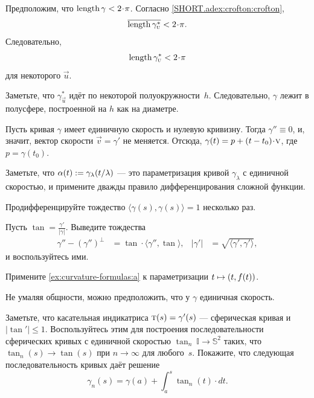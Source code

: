 \begin{multicols}{2}
Предположим, что $\length \gamma<2\cdot\pi$.
Согласно \ref{SHORT.adex:crofton:crofton},
\[\overline{\length \gamma^*_{\vec u}}<2\cdot\pi.\]
Следовательно, 
\[\length \gamma^*_{\vec u}<2\cdot\pi\]
для некоторого ${\vec u}$. 

Заметьте, что $\gamma^*_{\vec u}$ идёт по некоторой полуокружности~$h$.
Следовательно, $\gamma$ лежит в полусфере, построенной на $h$ как на диаметре.


\setcounter{eqtn}{0}

Пусть кривая $\gamma$ имеет единичную скорость и нулевую кривизну. 
Тогда $\gamma''\equiv 0$, и, значит, вектор скорости $\vec v=\gamma'$ не меняется.
Отсюда, $\gamma(t)\z=p+(t-t_0)\cdot \vec v$, где $p=\gamma(t_0)$.

Заметьте, что $\alpha(t)\mathrel{:=}\gamma_{\lambda}(t/\lambda)$ --- это параметризация кривой $ \gamma_{\lambda}$ с единичной скоростью,
и примените дважды правило дифференцирования сложной функции.

Продифференцируйте тождество $\langle\gamma(s),\gamma(s)\rangle=1$ несколько раз.

Пусть $\tan=\tfrac{\gamma'}{|\gamma|}$.
Выведите  тождества
\begin{align*}
\gamma''-(\gamma'')^\perp&=\tan\cdot\langle\gamma'',\tan\rangle,
&
|\gamma'|&=\sqrt{\langle \gamma',\gamma'\rangle},
\end{align*}
и воспользуйтесь ими.

Примените \ref{ex:curvature-formulas:a} к параметризации $t\z\mapsto (t,f(t))$.

Не умаляя общности, можно предположить, что у $\gamma$ единичная скорость.

Заметьте, что касательная индикатриса $\tan(s)\z=\gamma'(s)$ --- сферическая кривая и $|\tan'|\le 1$.
Воспользуйтесь этим для построения последовательности сферических кривых с единичной скоростью $\tan_n\:\mathbb{I}\to\mathbb{S}^2$ таких, что $\tan_n(s)\to \tan(s)$ при $n\to\infty$ для любого~$s$.
Покажите, что следующая последовательность кривых даёт решение
\[\gamma_n(s)=\gamma(a)+\int_a^s\tan_n(t)\cdot dt.\]


\end{multicols}
